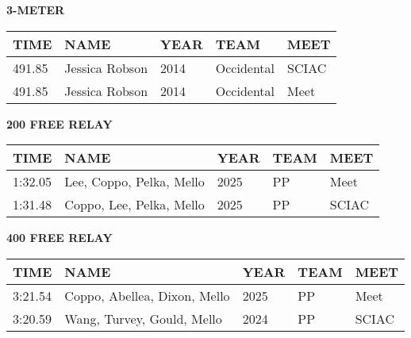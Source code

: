 \begin{table}[H]
\centering
\begin{minipage}[t]{0.6\textwidth}
\centering
\textbf{3-METER}\\[0.1cm]
\begin{tabular}{@{}p{1.8cm}p{2.8cm}p{1.2cm}p{1.4cm}p{1.4cm}@{}}
\hline
    \textbf{TIME} & \textbf{NAME} & \textbf{YEAR} & \textbf{TEAM} & \textbf{MEET} \\
\hline
    491.85 & Jessica Robson & 2014 & Occidental & SCIAC \\
    491.85 & Jessica Robson & 2014 & Occidental & Meet \\
\hline
\end{tabular}
\end{minipage}
\end{table}

\begin{table}[H]
\centering
\begin{minipage}[t]{0.6\textwidth}
\centering
\textbf{200 FREE RELAY}\\[0.1cm]
\begin{tabular}{@{}p{1.8cm}p{2.8cm}p{1.2cm}p{1.4cm}p{1.4cm}@{}}
\hline
    \textbf{TIME} & \textbf{NAME} & \textbf{YEAR} & \textbf{TEAM} & \textbf{MEET} \\
\hline
    1:32.05 & Lee, Coppo, Pelka, Mello & 2025 & PP & Meet \\
    1:31.48 & Coppo, Lee, Pelka, Mello & 2025 & PP & SCIAC \\
\hline
\end{tabular}
\end{minipage}
\end{table}

\begin{table}[H]
\centering
\begin{minipage}[t]{0.6\textwidth}
\centering
\textbf{400 FREE RELAY}\\[0.1cm]
\begin{tabular}{@{}p{1.8cm}p{2.8cm}p{1.2cm}p{1.4cm}p{1.4cm}@{}}
\hline
    \textbf{TIME} & \textbf{NAME} & \textbf{YEAR} & \textbf{TEAM} & \textbf{MEET} \\
\hline
    3:21.54 & Coppo, Abellea, Dixon, Mello & 2025 & PP & Meet \\
    3:20.59 & Wang, Turvey, Gould, Mello & 2024 & PP & SCIAC \\
\hline
\end{tabular}
\end{minipage}
\end{table}

